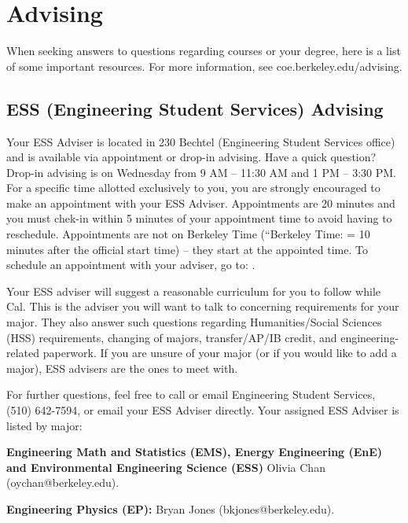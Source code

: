 \chapter*{Advising}

When seeking answers to questions regarding courses or your degree, here is a list of some important resources. For more information, see {\selectfont coe.berkeley.edu/advising}.

\section*{ESS (Engineering Student Services) Advising}

Your ESS Adviser is located in 230 Bechtel (Engineering Student Services office) and is available via appointment or drop-in advising.
Have a quick question?
Drop-in advising  is on Wednesday from 9 AM – 11:30 AM and 1 PM – 3:30 PM. For a specific time allotted exclusively to you, you are strongly encouraged to make an appointment with your ESS Adviser. Appointments are 20 minutes and you must chek-in within 5 minutes of your appointment time to avoid having to reschedule. Appointments are not on Berkeley Time (``Berkeley Time: = 10 minutes after the official start time) -- they start at the appointed time. To schedule an appointment with your adviser, go to: .

Your ESS adviser will suggest a reasonable curriculum for you to follow while Cal. This is the adviser you will want to talk to concerning requirements for your major. They also answer such questions regarding Humanities/Social Sciences (HSS) requirements, changing of majors, transfer/AP/IB credit, and engineering-related paperwork. If you are unsure of your major (or if you would like to add a major), ESS advisers are the ones to meet with.

For further questions, feel free to call or email Engineering Student Services, (510) 642-7594, or email your ESS Adviser directly. Your assigned ESS Adviser is listed by major:

\textbf{Engineering Math and Statistics (EMS), Energy Engineering (EnE) and Environmental Engineering Science (ESS)} Olivia Chan ({\selectfont oychan@berkeley.edu}).

\textbf{Engineering Physics (EP):} Bryan Jones ({\selectfont bkjones@berkeley.edu}).

